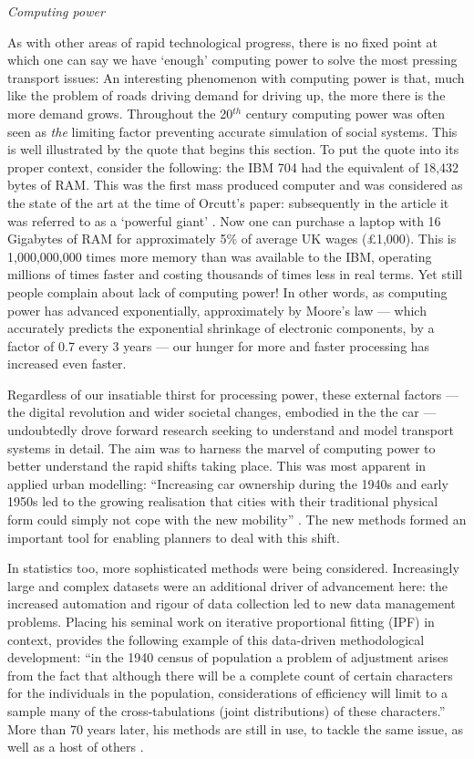 \emph{Computing power}

As with other areas of rapid technological progress, there is no
fixed point at which one can say we have `enough' computing power to solve the
most pressing transport issues: An interesting phenomenon with computing power
is that, much like the problem of roads driving demand for driving up, the more
there is the more demand grows. Throughout the 20$^{th}$ century computing power
was often seen
as \emph{the} limiting factor preventing accurate simulation of social systems.
This is well illustrated by the quote that begins this
section. To
put the quote into its proper context, consider the following: the
IBM 704 had the equivalent of 18,432 bytes of RAM. This was the first mass
produced computer and was
considered as the state of the art at the time of Orcutt's paper:
subsequently in the article it was referred to as a `powerful giant' 
\citep{Orcutt1957-new-type}. Now one can purchase a laptop with 16 Gigabytes of
RAM for approximately 5\% of average UK wages (\pounds1,000). This is
1,000,000,000
times more memory than was available to the IBM, operating millions of times
faster and costing thousands of times less in real terms. Yet still people
complain about lack of computing power! In other words, as computing power has
advanced exponentially, approximately by Moore's law --- which accurately
predicts the exponential shrinkage of electronic components, by a factor of 0.7
every 3 years \citep{kish2002end} --- our hunger for more and faster processing
has increased even faster.

Regardless of our insatiable thirst for processing power, these external factors
--- the digital revolution and wider societal changes, embodied in the the
car --- undoubtedly drove forward research seeking to understand and model
transport systems in detail. The aim was to harness the marvel of computing
power to better understand the rapid shifts taking place.
This was most apparent in applied urban modelling: ``Increasing car
ownership during the 1940s and early 1950s led to the growing realisation
that cities with their traditional physical form could simply not cope
with the new mobility'' \citep[p.~6]{batty1976urban}. The new methods formed an
important tool for enabling planners to deal with this shift. %

In statistics too, more
sophisticated methods were being considered. Increasingly large and complex
datasets were an additional driver of advancement here: the increased automation
and rigour of data collection led to new data management
problems. Placing his seminal work on iterative proportional fitting (IPF) in
context, \citet[p.~427]{Deming1940} provides the following example of this
data-driven methodological development:
``in the 1940 census of population a problem of adjustment arises from the fact
that although there will be a complete count of certain characters for the
individuals in the population, considerations of efficiency will limit to a
sample many of the cross-tabulations (joint distributions) of these
characters.'' More than 70 years later, his methods are still in use, to
tackle the same issue, as well as a host of others \citep{Jirousek1995}.

